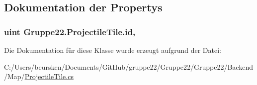 \subsection{Dokumentation der Propertys}
\hypertarget{class_gruppe22_1_1_projectile_tile_ab9b7a588cb5132cd66a09bef09616bb2}{
\subsubsection[{id}]{\setlength{\rightskip}{0pt plus 5cm}uint Gruppe22.\-Projectile\-Tile.\-id\hspace{0.3cm}{\ttfamily [get]}, {\ttfamily [set]}}}\label{class_gruppe22_1_1_projectile_tile_ab9b7a588cb5132cd66a09bef09616bb2}


Die Dokumentation für diese Klasse wurde erzeugt aufgrund der Datei\-:\begin{DoxyCompactItemize}
\item 
C\-:/\-Users/beursken/\-Documents/\-Git\-Hub/gruppe22/\-Gruppe22/\-Gruppe22/\-Backend/\-Map/\hyperlink{_projectile_tile_8cs}{Projectile\-Tile.\-cs}\end{DoxyCompactItemize}
